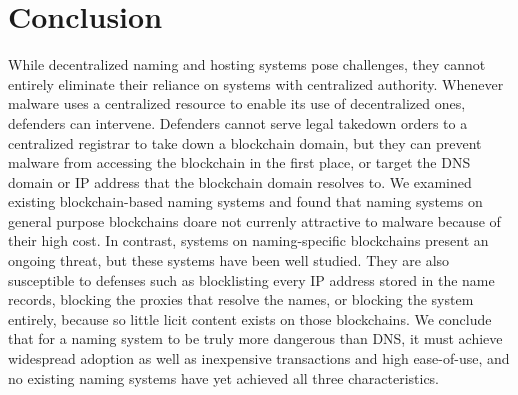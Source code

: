 \section{Conclusion}

While decentralized naming and hosting systems pose challenges, they cannot 
entirely 
eliminate their reliance on systems with centralized authority. Whenever 
malware uses a centralized 
resource to enable its use of decentralized ones, defenders can intervene. 
Defenders cannot serve 
legal takedown orders to a centralized registrar to take 
down a blockchain domain, but they can prevent malware from accessing the 
blockchain in the first 
place, or target the DNS domain or IP address that the blockchain domain 
resolves to. We examined existing blockchain-based naming systems and found 
that naming systems on general purpose blockchains doare not 
currenly attractive to malware because of their high cost. In 
contrast, systems on naming-specific blockchains present an 
ongoing threat, but these systems have 
been well studied. They are also susceptible 
to defenses such as 
blocklisting every IP address stored in the name records, 
blocking the proxies that resolve the names, or blocking 
the system entirely, because so little licit 
content exists on those blockchains. We conclude that for a naming system to be 
truly more dangerous than DNS, it must achieve widespread 
adoption as well as inexpensive transactions and high 
ease-of-use, and no existing naming systems have yet achieved 
all three characteristics. 